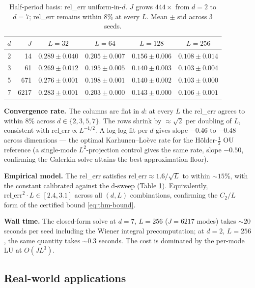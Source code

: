 \begin{table}[h]
\centering
\caption{Half-period basis: rel\_err uniform-in-$d$. $J$ grows
$444 \times$ from $d = 2$ to $d = 7$; rel\_err remains within
$8\%$ at every $L$. Mean $\pm$ std across 3 seeds.}
\label{tab:halfperiod-headline}
\begin{tabular}{rrcccc}
\toprule
$d$ & $J$ & $L = 32$ & $L = 64$ & $L = 128$ & $L = 256$ \\
\midrule
2 & 14   & $0.289 \pm 0.040$ & $0.205 \pm 0.007$ & $0.156 \pm 0.006$ & $0.108 \pm 0.014$ \\
3 & 61   & $0.269 \pm 0.012$ & $0.195 \pm 0.005$ & $0.140 \pm 0.003$ & $0.103 \pm 0.004$ \\
5 & 671  & $0.276 \pm 0.001$ & $0.198 \pm 0.001$ & $0.140 \pm 0.002$ & $0.103 \pm 0.000$ \\
7 & 6217 & $0.283 \pm 0.001$ & $0.203 \pm 0.000$ & $0.143 \pm 0.000$ & $0.106 \pm 0.001$ \\
\bottomrule
\end{tabular}
\end{table}

\textbf{Convergence rate.} The columns are flat in $d$: at every $L$
the rel\_err agrees to within $8\%$ across $d \in \{2, 3, 5, 7\}$.
The rows shrink by $\approx \sqrt{2}$ per doubling of $L$, consistent
with $\mathrm{rel\_err} \propto L^{-1/2}$. A log-log fit per $d$ gives
slope $-0.46$ to $-0.48$ across dimensions --- the optimal
Karhunen--Lo\`eve rate for the H\"older-$\tfrac12$ OU reference (a
single-mode $L^2$-projection control gives the same rate, slope
$-0.50$, confirming the Galerkin solve attains the
best-approximation floor).

\textbf{Empirical model.} The rel\_err satisfies
$\mathrm{rel\_err} \approx 1.6/\sqrt{L}$ to within $\sim 15\%$, with
the constant calibrated against the d-sweep (Table
\ref{tab:halfperiod-headline}). Equivalently,
$\mathrm{rel\_err}^2 \cdot L \in [2.4, 3.1]$ across all $(d, L)$
combinations, confirming the $C_2/L$ form of the certified bound
\eqref{eq:thm-bound}.

\textbf{Wall time.} The closed-form solve at $d = 7$, $L = 256$
($J = 6217$ modes) takes $\sim 20$ seconds per seed including the
Wiener integral precomputation; at $d = 2$, $L = 256$, the same
quantity takes $\sim 0.3$ seconds. The cost is dominated by the
per-mode LU at $O(JL^3)$.

\subsection{Real-world applications}
\label{sec:exp:realworld}


